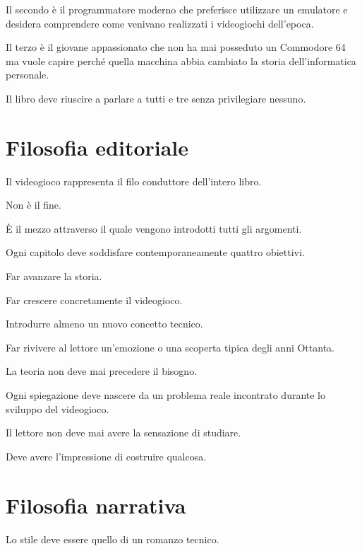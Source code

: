 \documentclass{article}
\begin{document}
Il secondo è il programmatore moderno che preferisce utilizzare un emulatore e desidera comprendere come venivano
realizzati i videogiochi dell'epoca.

Il terzo è il giovane appassionato che non ha mai posseduto un Commodore 64 ma vuole capire perché quella macchina abbia
cambiato la storia dell'informatica personale.

Il libro deve riuscire a parlare a tutti e tre senza privilegiare nessuno.



\section{Filosofia editoriale}
Il videogioco rappresenta il filo conduttore dell'intero libro.

Non è il fine.

È il mezzo attraverso il quale vengono introdotti tutti gli argomenti.

Ogni capitolo deve soddisfare contemporaneamente quattro obiettivi.

Far avanzare la storia.

Far crescere concretamente il videogioco.

Introdurre almeno un nuovo concetto tecnico.

Far rivivere al lettore un'emozione o una scoperta tipica degli anni Ottanta.

La teoria non deve mai precedere il bisogno.

Ogni spiegazione deve nascere da un problema reale incontrato durante lo sviluppo del videogioco.

Il lettore non deve mai avere la sensazione di studiare.

Deve avere l'impressione di costruire qualcosa.



\section{Filosofia narrativa}
Lo stile deve essere quello di un romanzo tecnico.
\end{document}
